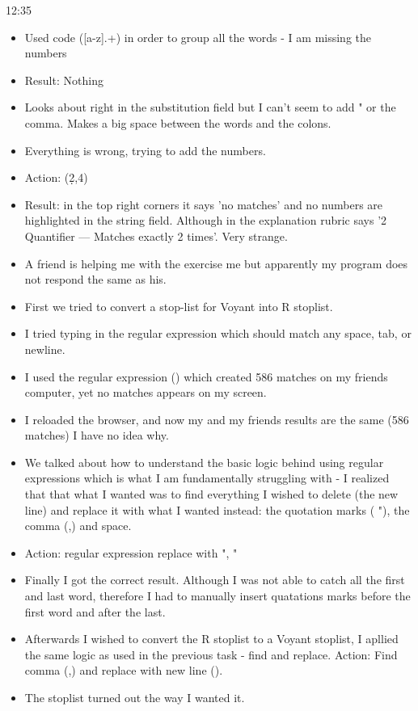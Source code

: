 \documentclass{article}
\begin{document}
{12:35}
\begin{itemize}
\item Used code ([a-z].+) in order to group all the words - I am missing the numbers
\item Result: Nothing 
\item  Looks about right in the substitution field but I can't seem to add " or the comma. Makes a big space between the words and the colons. 
\item Everything is wrong, trying to add the numbers.
\item Action: (\d{2,4})
\item Result:  in the top right corners it says 'no matches' and no numbers are highlighted in the string field. Although in the explanation rubric says '{2} Quantifier — Matches exactly 2 times'. Very strange. 

\item A friend is helping me with the exercise me but apparently my program does not respond the same as his. 
\item First we tried to convert a stop-list for Voyant into R stoplist. 
\item I tried typing in the regular expression \s which should match any space, tab, or newline.
\item I used the regular expression (\s) which created 586 matches on my friends computer, yet no matches appears on my screen. 
\item I reloaded the browser, and now my and my friends results are  the same (586 matches) I have no idea why. 
\item We talked about how to understand the basic logic behind using regular expressions which is what I am fundamentally struggling with - I realized that that what I wanted was to find everything I wished to delete (the new line) and replace it with what I wanted instead: the quotation marks ( "), the comma (,)  and space. 
\item Action: regular expression \s replace with ", "
\item Finally I  got the correct result. Although I was not able to catch all the first and last word, therefore I had to manually insert quatations marks before the first word and after the last. 
\item Afterwards I wished to convert the R stoplist to a Voyant stoplist, I apllied the same logic as used in the previous task - find and replace.
Action: Find comma (,) and replace with new line (\s). 
\item The stoplist turned out the way I wanted it. 
\end{itemize} 
\end{document}
